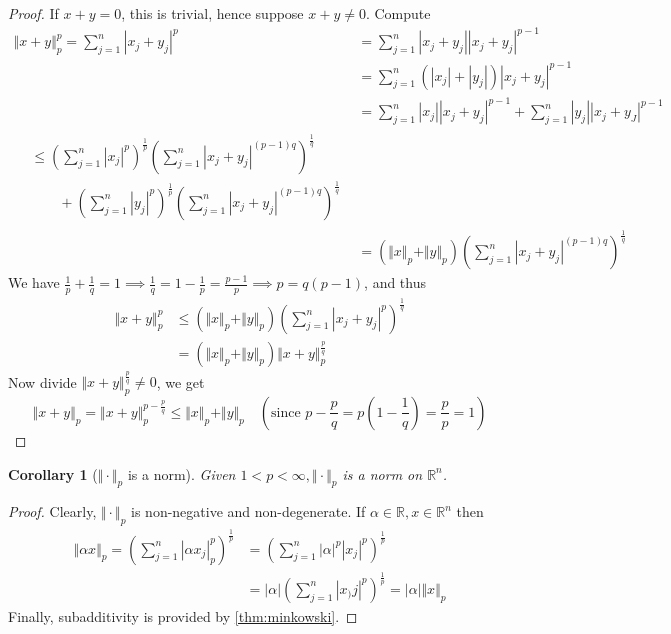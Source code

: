 \documentclass[11pt, oneside]{book}
\theoremstyle{break}
\newtheorem*{proof}{Proof}
\newtheorem{crly}{Corollary}[section]
\newcommand{\bb}[1]{\mathbb{#1}}			%
\begin{document}
\begin{proof}
	If $x  + y = 0$, this is trivial, hence suppose $x + y \neq 0$. Compute
	\begin{align*}
		\Vert x + y\Vert _p^p = \sum_{j=1}^{n} |x_j + y_j|^p &= \sum_{j=1}^{n} |x_j + y_j||x_j + y_j|^{p - 1} \\
					&= \sum_{j=1}^{n} \left( |x_j| + |y_j| \right) |x_j + y_j|^{p - 1} \\
					&= \sum_{j=1}^{n} |x_j||x_j + y_j|^{p-1} + \sum_{j=1}^{n} |y_j||x_j + y_J|^{p-1} \\
					\begin{split}
						&\leq \left( \sum_{j=1}^{n} |x_j|^p \right)^{\frac{1}{p}} \left( \sum_{j=1}^{n} |x_j + y_j|^{(p-1)q} \right)^{\frac{1}{q} } \\
						 &\qquad + \left( \sum_{j=1}^{n} |y_j|^p \right)^{\frac{1}{p}} \left( \sum_{j=1}^{n} |x_j + y_j|^{(p-1)q} \right)^{\frac{1}{q}}
					\end{split} \\
					&= (\Vert x\Vert _p + \Vert y\Vert _p) \left( \sum_{j=1}^{n} |x_j + y_j|^{(p-1)q} \right)^{\frac{1}{q}}
	\end{align*}
	We have $\frac{1}{p} + \frac{1}{q} = 1 \implies \frac{1}{q} = 1 - \frac{1}{p} = \frac{p-1}{p} \implies p = q(p - 1)$, and thus
	\begin{align*}
		\Vert x + y\Vert _p^p &\leq (\Vert x\Vert _p + \Vert y\Vert _p) \left(\sum_{j=1}^{n} |x_j + y_j|^p \right)^{\frac{1}{q} } \\
					&= (\Vert x\Vert _p + \Vert y\Vert _p) \Vert x + y\Vert _p^\frac{p}{q} 
	\end{align*}
	Now divide $\Vert x + y\Vert _p^\frac{p}{q}  \neq 0$, we get
	\begin{equation}
		\Vert x + y\Vert _p = \Vert x + y\Vert _p^{p - \frac{p}{q}} \leq \Vert x\Vert _p + \Vert y\Vert _p \quad (\text{since } p - \frac{p}{q} = p(1 - \frac{1}{q}) = \frac{p}{p} = 1)
	\end{equation}
\end{proof}

\begin{crly}[$\Vert \cdot\Vert _p$ is a norm]
	Given $1 < p < \infty, \Vert \cdot\Vert _p$ is a norm on $\bb{R}^n$.
\end{crly}

\begin{proof}
	Clearly, $\Vert \cdot\Vert _p$ is non-negative and non-degenerate. If $\alpha \in \bb{R}, x \in \bb{R}^n$ then
	\begin{align*}
		\Vert \alpha x\Vert _p = \left( \sum_{j=1}^{n} |\alpha x_j|_p^p \right)^{\frac{1}{p}} &= \left( \sum_{j=1}^{n} |\alpha|^p|x_j|^p \right)^{\frac{1}{p}} \\
						&= |\alpha| \left( \sum_{j=1}^{n} |x_)j|^p \right)^{\frac{1}{p}} = |\alpha|\Vert x \Vert_p
	\end{align*}
	Finally, subadditivity is provided by \autoref{thm:minkowski}.
\end{proof}
\end{document}
